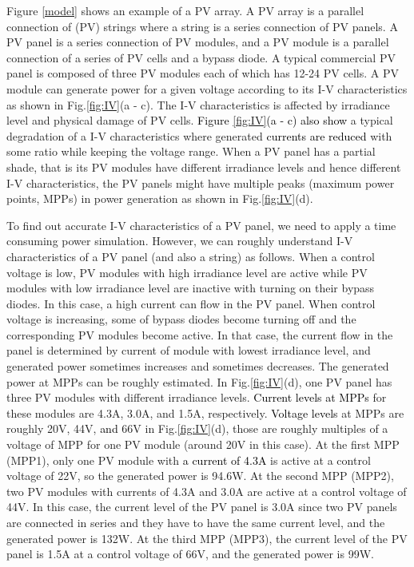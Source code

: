\documentclass[conference]{pvsctran}
\newcommand{\michiko}{\textcolor{black}}
\begin{document}
Figure \ref{model} shows an example of a PV array. 
A PV array is a parallel connection of (PV) strings where a string is a series connection of PV panels. 
A PV panel is a series connection of PV modules, and a PV module is a parallel connection of a series of PV cells and a bypass diode. 
A typical commercial PV panel is composed of three PV modules each of which has 12-24 PV cells. 
A PV module can generate power for a given voltage according to its I-V characteristics as shown in Fig.\ref{fig:IV}(a - c). 
The I-V characteristics is affected by irradiance level and physical damage of PV cells. 
\michiko{Figure \ref{fig:IV}(a - c) also show} a typical degradation of a I-V characteristics where generated \michiko{currents are reduced} with some ratio while keeping the voltage range. 
When a PV panel has a partial shade, that is its PV modules have different irradiance levels and hence different I-V characteristics, the PV panels might have multiple peaks (maximum power points, MPPs) in power generation as shown in Fig.\ref{fig:IV}(d). 

To find out accurate I-V characteristics of a PV panel, we need to apply a time consuming power simulation. 
However, we can roughly understand I-V characteristics of a PV panel (and also a string) as follows. 
When a control voltage is low, PV modules with high irradiance level are active while PV modules with low irradiance level are inactive with turning on their bypass diodes.
In this case, a high current can flow in the PV panel. When control voltage is increasing, some of bypass diodes become turning off and the corresponding PV modules become active. 
In that case, the current flow in the panel is determined by current of module with lowest irradiance level, and generated power sometimes increases and sometimes decreases.
The generated power at MPPs can be roughly estimated. 
In Fig.\ref{fig:IV}(d), one PV panel has three PV modules with different irradiance levels. 
\michiko{Current levels at MPPs} for these modules are 4.3A, 3.0A, and 1.5A, respectively. 
\michiko{Voltage levels} at MPPs are roughly 20V, 44V, \michiko{and} 66V in Fig.\ref{fig:IV}(d), those are roughly multiples of a voltage of MPP for one PV module (around 20V in this case). 
At the first MPP (MPP1), only one PV module with \michiko{a current of 4.3A} is active at a control voltage of 22V, so the generated power is 94.6W. 
At the second MPP (MPP2), two PV modules with currents of 4.3A and 3.0A are active at a control voltage of 44V. 
In this case, the current level of the PV panel is 3.0A since two PV panels are connected in series and they have to have the same current level, and the generated power is 132W.
At the third MPP (MPP3), the current level of the PV panel is 1.5A at a control voltage of 66V, and the generated power is 99W. 
\end{document}
